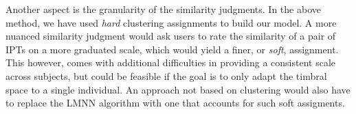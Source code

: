 \documentclass{bmcart}
\begin{document}
Another aspect is the granularity of the similarity judgments.
In the above method, we have used \emph{hard} clustering assignments to build our model.
A more nuanced similarity judgment would ask users to rate the similarity of a pair of IPTs on a more graduated scale, which would yield a finer, or \emph{soft}, assignment.
This however, comes with additional difficulties in providing a consistent scale across subjects, but could be feasible if the goal is to only adapt the timbral space to a single individual.
An approach not based on clustering would also have to replace the LMNN algorithm with one that accounts for such soft assigments.

\end{document}
